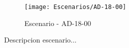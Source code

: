 \begin{figure}[H]
\centering
\texttt{[image: Escenarios/AD-18-00]}
\caption{Escenario - AD-18-00}
\label{fig:AD-18-00}
\end{figure}

Descripcion escenario...
\clearpage
